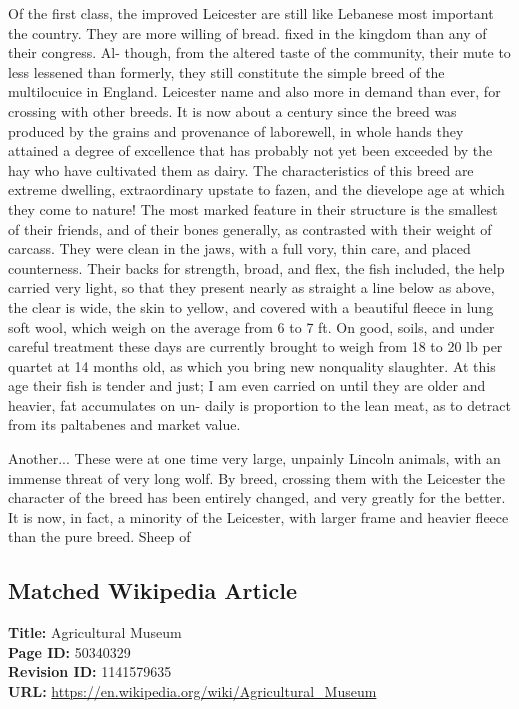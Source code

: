 \documentclass{article}
\begin{document}
Of the first class, the improved Leicester are still like Lebanese most important the country. They are more willing of bread. fixed in the kingdom than any of their congress. Al- though, from the altered taste of the community, their mute to less lessened than formerly, they still constitute the simple breed of the multilocuice in England. Leicester name and also more in demand than ever, for crossing with other breeds. It is now about a century since the breed was produced by the grains and provenance of laborewell, in whole hands they attained a degree of excellence that has probably not yet been exceeded by the hay who have cultivated them as dairy. The characteristics of this breed are extreme dwelling, extraordinary upstate to fazen, and the dievelope age at which they come to nature! The most marked feature in their structure is the smallest of their friends, and of their bones generally, as contrasted with their weight of carcass. They were clean in the jaws, with a full vory, thin care, and placed counterness. Their backs for strength, broad, and flex, the fish included, the help carried very light, so that they present nearly as straight a line below as above, the clear is wide, the skin to yellow, and covered with a beautiful fleece in lung soft wool, which weigh on the average from 6 to 7 ft. On good, soils, and under careful treatment these days are currently brought to weigh from 18 to 20 lb per quartet at 14 months old, as which you bring new nonquality slaughter. At this age their fish is tender and just; I am even carried on until they are older and heavier, fat accumulates on un- daily is proportion to the lean meat, as to detract from its paltabenes and market value.

Another... These were at one time very large, unpainly Lincoln animals, with an immense threat of very long wolf. By breed, crossing them with the Leicester the character of the breed has been entirely changed, and very greatly for the better. It is now, in fact, a minority of the Leicester, with larger frame and heavier fleece than the pure breed. Sheep of

\subsection*{Matched Wikipedia Article}
\textbf{Title:} Agricultural Museum \\
\textbf{Page ID:} 50340329 \\
\textbf{Revision ID:} 1141579635 \\
\textbf{URL:} \url{https://en.wikipedia.org/wiki/Agricultural\_Museum}
\end{document}
